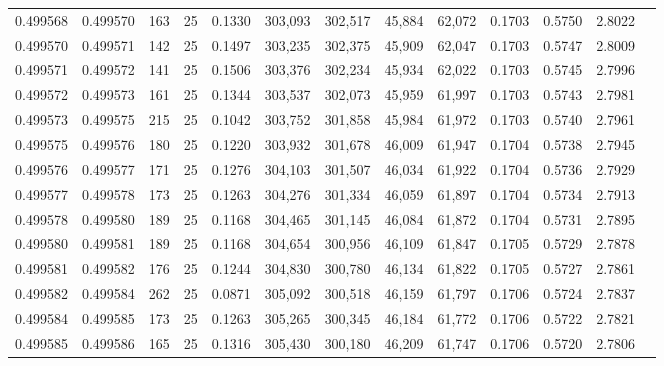 \begin{tabular}{rrrrrrrrrrrrr}
0.499568 & 0.499570 & 163 &  25 &                                     0.1330 & 303,093 & 302,517 &  45,884 &  62,072 & 0.1703 & 0.5750 & 2.8022 \\
0.499570 & 0.499571 & 142 &  25 &                                     0.1497 & 303,235 & 302,375 &  45,909 &  62,047 & 0.1703 & 0.5747 & 2.8009 \\
0.499571 & 0.499572 & 141 &  25 &                                     0.1506 & 303,376 & 302,234 &  45,934 &  62,022 & 0.1703 & 0.5745 & 2.7996 \\
0.499572 & 0.499573 & 161 &  25 &                                     0.1344 & 303,537 & 302,073 &  45,959 &  61,997 & 0.1703 & 0.5743 & 2.7981 \\
0.499573 & 0.499575 & 215 &  25 &                                     0.1042 & 303,752 & 301,858 &  45,984 &  61,972 & 0.1703 & 0.5740 & 2.7961 \\
0.499575 & 0.499576 & 180 &  25 &                                     0.1220 & 303,932 & 301,678 &  46,009 &  61,947 & 0.1704 & 0.5738 & 2.7945 \\
0.499576 & 0.499577 & 171 &  25 &                                     0.1276 & 304,103 & 301,507 &  46,034 &  61,922 & 0.1704 & 0.5736 & 2.7929 \\
0.499577 & 0.499578 & 173 &  25 &                                     0.1263 & 304,276 & 301,334 &  46,059 &  61,897 & 0.1704 & 0.5734 & 2.7913 \\
0.499578 & 0.499580 & 189 &  25 &                                     0.1168 & 304,465 & 301,145 &  46,084 &  61,872 & 0.1704 & 0.5731 & 2.7895 \\
0.499580 & 0.499581 & 189 &  25 &                                     0.1168 & 304,654 & 300,956 &  46,109 &  61,847 & 0.1705 & 0.5729 & 2.7878 \\
0.499581 & 0.499582 & 176 &  25 &                                     0.1244 & 304,830 & 300,780 &  46,134 &  61,822 & 0.1705 & 0.5727 & 2.7861 \\
0.499582 & 0.499584 & 262 &  25 &                                     0.0871 & 305,092 & 300,518 &  46,159 &  61,797 & 0.1706 & 0.5724 & 2.7837 \\
0.499584 & 0.499585 & 173 &  25 &                                     0.1263 & 305,265 & 300,345 &  46,184 &  61,772 & 0.1706 & 0.5722 & 2.7821 \\
0.499585 & 0.499586 & 165 &  25 &                                     0.1316 & 305,430 & 300,180 &  46,209 &  61,747 & 0.1706 & 0.5720 & 2.7806 \\

\end{tabular}
